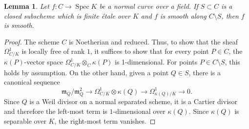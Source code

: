 \documentclass[11pt]{amsart}
\newcommand{\mf}[1]{\mathfrak #1}
\newcommand{\spec}{\operatorname{Spec}}
\renewcommand{\[}{[\!\hspace{0.03em}[}
\renewcommand{\]}{]\!\hspace{0.03em}]}
\renewcommand{\(}{(\!\hspace{0.03em}(}
\renewcommand{\)}{)\!\hspace{0.03em})}
\DeclareMathOperator*{\tensor}{\otimes}
\newtheorem{lem}{Lemma}[subsubsection]%
\theoremstyle{definition}
\theoremstyle{remark}
\begin{document}
\begin{lem}\label{L:removing etale good} Let $f:C\to \spec K$ be a normal curve over a field.  If 
$S\subset C$ is a closed subscheme which is finite \'etale over $K$ 
and $f$ is smooth along $C\setminus S$, then $f$ is smooth.
\end{lem}
\begin{proof} The scheme $C$ is Noetherian and reduced.  Thus, to show 
that the sheaf $\Omega^{1}_{C/K}$ is locally free of rank $1$, it 
suffices to show that for every point $P\in C$, the $\kappa(P)$-vector space 
$\Omega^{1}_{C/K}\tensor_{C}\kappa(P)$ is 1-dimensional.  For points 
$P\in C\setminus S$, this holds by assumption.  On the other hand, 
given a point $Q\in S$, there is a canonical sequence
$$\mf m_{Q}/\mf 
m_{Q}^{2}\to\Omega^{1}_{C/K}\tensor\kappa(Q)\to\Omega^{1}_{\kappa(Q)/K}\to 0.$$
Since $Q$ is a Weil divisor on a normal separated scheme, it is a 
Cartier divisor and therefore the left-most term is $1$-dimensional 
over $\kappa(Q)$.  Since $\kappa(Q)$ is separable over $K$, the 
right-most term vanishes.
\end{proof}
\end{document}
